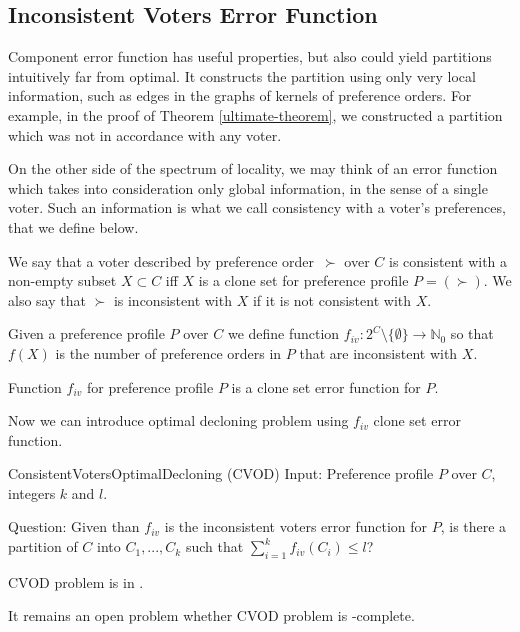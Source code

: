 \subsection{Inconsistent Voters Error Function}

Component error function has useful properties, but also could yield partitions
intuitively far from optimal.
It constructs the partition using only very local information,
such as edges in the graphs of kernels of preference orders.
For example, in the proof of Theorem \ref{ultimate-theorem}, we constructed a partition
which was not in accordance with any voter.

On the other side of the spectrum of locality, we may think of an error function which
takes into consideration only global information, in the sense of a single voter.
Such an information is what we call consistency with a voter's preferences, that we define below.

\begin{defn}
We say that a voter described by preference order~$\succ$ over $C$
is consistent with a non-empty subset $X \subset C$
iff $X$ is a clone set for preference profile $P = (\succ)$.
We also say that $\succ$ is inconsistent with $X$ if it is not consistent with $X$.
\end{defn}

\begin{defn}
Given a preference profile $P$ over $C$ we define function
$f_{iv}: 2^C \setminus \{\emptyset\} \rightarrow \mathbb{N}_0$ so that
$f(X)$ is the number of preference orders in $P$ that are inconsistent with $X$.
\end{defn}

\begin{rmrk}
Function $f_{iv}$ for preference profile $P$ is a clone set error function for $P$.
\end{rmrk}

Now we can introduce optimal decloning problem using $f_{iv}$ clone set error function.

\begin{problem}{ConsistentVotersOptimalDecloning (CVOD)}
	Input: Preference profile $P$ over $C$, integers $k$ and $l$.

	Question: Given than $f_{iv}$ is the inconsistent voters error function for $P$,
		is there a partition of $C$ into $C_1, ..., C_k$ such that $\sum_{i=1}^k f_{iv}(C_i) \leq l$?
\end{problem}

\begin{rmrk}
\textsc{CVOD} problem is in \np.
\end{rmrk}

It remains an open problem whether \textsc{CVOD} problem is \np-complete.
